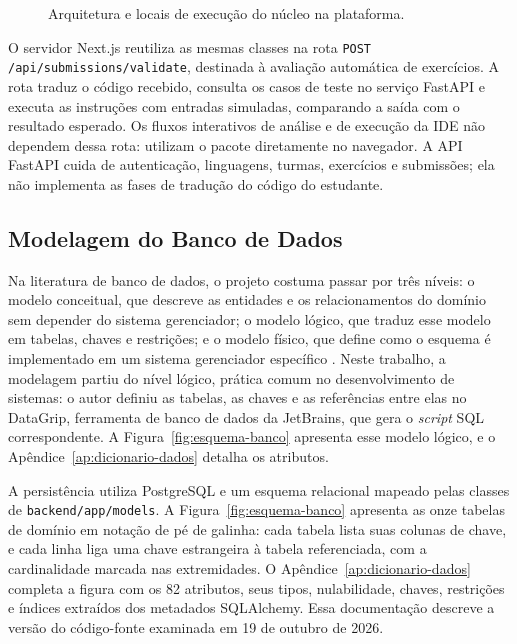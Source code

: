 \begin{figure}[p]
    \centering
    \caption{Arquitetura e locais de execução do núcleo na plataforma.}
    \label{fig:arquitetura-geral-interpretador}
    
\end{figure}

O servidor Next.js reutiliza as mesmas classes na rota \texttt{POST /api/submissions/}\allowbreak\texttt{validate}, destinada à avaliação automática de exercícios. A rota traduz o código recebido, consulta os casos de teste no serviço FastAPI e executa as instruções com entradas simuladas, comparando a saída com o resultado esperado. Os fluxos interativos de análise e de execução da IDE não dependem dessa rota: utilizam o pacote diretamente no navegador. A API FastAPI cuida de autenticação, linguagens, turmas, exercícios e submissões; ela não implementa as fases de tradução do código do estudante.

\subsection{Modelagem do Banco de Dados}
\label{subsec:modelagem-banco}

Na literatura de banco de dados, o projeto costuma passar por três níveis: o modelo conceitual, que descreve as entidades e os relacionamentos do domínio sem depender do sistema gerenciador; o modelo lógico, que traduz esse modelo em tabelas, chaves e restrições; e o modelo físico, que define como o esquema é implementado em um sistema gerenciador específico \cite{elmasri2016,heuser2009}. Neste trabalho, a modelagem partiu do nível lógico, prática comum no desenvolvimento de sistemas: o autor definiu as tabelas, as chaves e as referências entre elas no DataGrip, ferramenta de banco de dados da JetBrains, que gera o \textit{script} SQL correspondente. A Figura~\ref{fig:esquema-banco} apresenta esse modelo lógico, e o Apêndice~\ref{ap:dicionario-dados} detalha os atributos.

A persistência utiliza PostgreSQL e um esquema relacional mapeado pelas classes de \texttt{backend/app/models}. A Figura~\ref{fig:esquema-banco} apresenta as onze tabelas de domínio em notação de pé de galinha: cada tabela lista suas colunas de chave, e cada linha liga uma chave estrangeira à tabela referenciada, com a cardinalidade marcada nas extremidades. O Apêndice~\ref{ap:dicionario-dados} completa a figura com os 82 atributos, seus tipos, nulabilidade, chaves, restrições e índices extraídos dos metadados SQLAlchemy. Essa documentação descreve a versão do código-fonte examinada em 19 de outubro de 2026.

